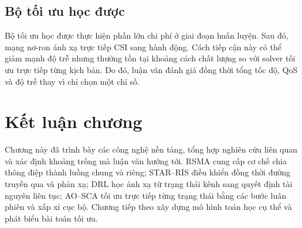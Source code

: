 \subsection{Bộ tối ưu học được}
Bộ tối ưu học được thực hiện phần lớn chi phí ở giai đoạn huấn luyện. Sau đó, mạng nơ-ron ánh xạ trực tiếp CSI sang hành động. Cách tiếp cận này có thể giảm mạnh độ trễ nhưng thường tồn tại khoảng cách chất lượng so với solver tối ưu trực tiếp từng kịch bản. Do đó, luận văn đánh giá đồng thời tổng tốc độ, QoS và độ trễ thay vì chỉ chọn một chỉ số.

\section{Kết luận chương}
Chương này đã trình bày các công nghệ nền tảng, tổng hợp nghiên cứu liên quan và xác định khoảng trống mà luận văn hướng tới. RSMA cung cấp cơ chế chia thông điệp thành luồng chung và riêng; STAR--RIS điều khiển đồng thời đường truyền qua và phản xạ; DRL học ánh xạ từ trạng thái kênh sang quyết định tài nguyên liên tục; AO--SCA tối ưu trực tiếp từng trạng thái bằng các bước luân phiên và xấp xỉ cục bộ. Chương tiếp theo xây dựng mô hình toán học cụ thể và phát biểu bài toán tối ưu.
